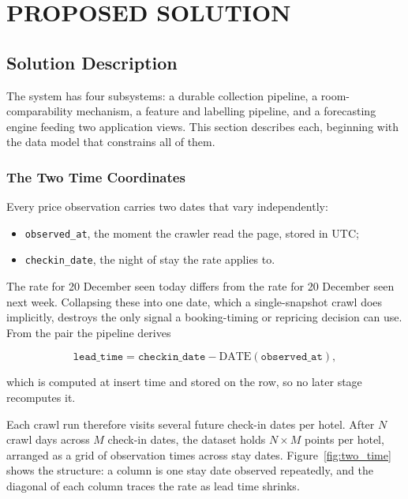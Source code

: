 \chapter{PROPOSED SOLUTION}

\section{Solution Description}

The system has four subsystems: a durable collection pipeline, a room-comparability mechanism, a feature and labelling pipeline, and a forecasting engine feeding two application views. This section describes each, beginning with the data model that constrains all of them.

\subsection{The Two Time Coordinates}
\label{sec:two_time}

Every price observation carries two dates that vary independently:

\begin{itemize}[leftmargin=*]
    \item \texttt{observed\_at}, the moment the crawler read the page, stored in UTC;
    \item \texttt{checkin\_date}, the night of stay the rate applies to.
\end{itemize}

The rate for 20 December seen today differs from the rate for 20 December seen next week. Collapsing these into one date, which a single-snapshot crawl does implicitly, destroys the only signal a booking-timing or repricing decision can use. From the pair the pipeline derives

\[
\texttt{lead\_time} = \texttt{checkin\_date} - \mathrm{DATE}(\texttt{observed\_at}),
\]

which is computed at insert time and stored on the row, so no later stage recomputes it.

Each crawl run therefore visits several future check-in dates per hotel. After $N$ crawl days across $M$ check-in dates, the dataset holds $N \times M$ points per hotel, arranged as a grid of observation times across stay dates. Figure~\ref{fig:two_time} shows the structure: a column is one stay date observed repeatedly, and the diagonal of each column traces the rate as lead time shrinks.

